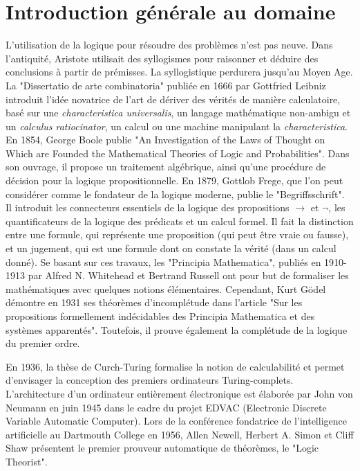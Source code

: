 \section{Introduction générale au domaine}


L'utilisation de la logique pour résoudre des problèmes n'est pas neuve. Dans l'antiquité, Aristote utilisait des syllogismes pour raisonner et déduire des conclusions à partir de prémisses. La syllogistique perdurera jusqu'au Moyen Age. La "Dissertatio de arte combinatoria" publiée en 1666 par Gottfried Leibniz introduit l'idée novatrice de l’art de dériver des vérités de manière calculatoire, basé sur une \emph{characteristica universalis}, un langage mathématique non-ambigu et un \emph{calculus ratiocinator}, un calcul ou une machine manipulant la \emph{characteristica}.
En 1854, George Boole publie "An Investigation of the Laws of Thought on Which are Founded the Mathematical Theories of Logic and Probabilities". Dans son ouvrage, il propose un traitement algébrique, ainsi qu'une procédure de décision pour la logique propositionnelle.
En 1879, Gottlob Frege, que l'on peut considérer comme le fondateur de la logique moderne, publie le "Begriffsschrift". Il introduit les connecteurs essentiels de la logique des propositions $\rightarrow$ et $\neg$, les quantificateurs de la logique des prédicats et un calcul formel. Il fait la distinction entre une formule, qui représente une proposition
(qui peut être vraie ou fausse), et un jugement, qui est une formule dont on constate la vérité (dans un calcul donné).
Se basant sur ces travaux, les "Principia Mathematica", publiés en 1910-1913 par Alfred N. Whitehead et Bertrand Russell ont pour but de formaliser les mathématiques avec quelques notions élémentaires. Cependant, Kurt Gödel démontre en 1931 ses théorèmes d'incomplétude dans l'article "Sur les propositions formellement indécidables des Principia Mathematica et des systèmes apparentés". Toutefois, il prouve également la complétude de la logique du premier ordre.

En 1936, la thèse de Curch-Turing formalise la notion de calculabilité et permet d'envisager la conception des premiers ordinateurs Turing-complets. L'architecture d'un ordinateur entièrement électronique est élaborée par John von Neumann en juin 1945 dans le cadre du projet EDVAC (Electronic Discrete Variable Automatic Computer).
Lors de la conférence fondatrice de l'intelligence artificielle au Dartmouth College en 1956,  Allen Newell, Herbert A. Simon et Cliff Shaw présentent le premier prouveur automatique de théorèmes, le "Logic Theorist".

